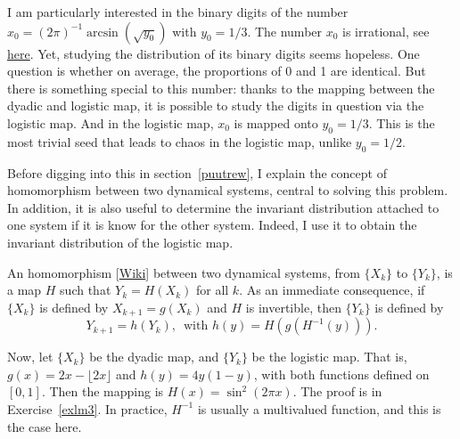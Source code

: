 \documentclass[oneside,10pt]{book}
\begin{document}
 I am particularly interested in the binary digits of the number
 $x_0=(2\pi)^{-1}\arcsin(\sqrt{y_0})$ with $y_0=1/3$.
The number $x_0$ is irrational, see \href{https://mathoverflow.net/questions/441714/does-x-0-1-3-lead-to-periodicity-in-the-logistic-map-x-k1-4x-k1-x-k/}{here}. Yet, studying the distribution of its binary digits seems hopeless. One question is whether
 on average, the proportions of 0 and 1 are identical. But there is something special to this number: thanks to the mapping between the dyadic and logistic map, it is possible to study the digits in question via the logistic map. And in the logistic map, $x_0$ is mapped onto $y_0 = 1/3$. This is the most trivial seed that leads to chaos in the logistic map, unlike $y_0=1/2$. 

Before digging into this in section~\ref{puutrew}, I explain the concept of
 homomorphism between two dynamical systems, central to solving this problem. In addition, it is also useful to determine the 
\textcolor{index}{invariant distribution} attached to one system if it is know for the other system. Indeed,
 I use it to obtain the invariant distribution of the logistic map.

An \textcolor{index}{homomorphism} [\href{https://en.wikipedia.org/wiki/homomorphism}{Wiki}]  between 
 two dynamical systems, from $\{X_k\}$ to $\{Y_k\}$,  is a map $H$ such that $Y_k=H(X_k)$ for all $k$. 
 As an immediate consequence, if $\{X_k\}$ is defined by $X_{k+1}=g(X_k)$ and $H$ is invertible, then $\{Y_k\}$ is defined
 by 
$$
Y_{k+1}=h(Y_k), \, \text{ with } h(y)= H(g(H^{-1}(y))).
$$


Now, let $\{X_k\}$ be the dyadic map, and $\{Y_k\}$ be the logistic map. That is, $g(x) = 2x - \lfloor 2x \rfloor$ and
 $h(y) = 4y(1-y)$, with both functions defined on $[0, 1]$. Then the mapping is $H(x) =  \sin^2(2\pi x)$. The proof is in 
 Exercise~\ref{exlm3}. In practice, $H^{-1}$ is usually a multivalued function, and this is the case here.
\end{document}

